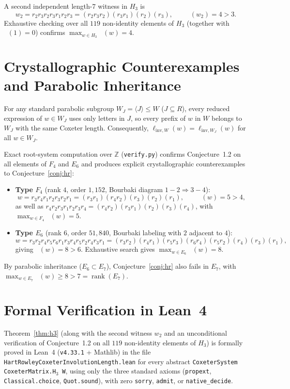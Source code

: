 \documentclass[11pt,a4paper]{article}
\DeclareMathOperator{\ilen}{\ell_{\mathrm{inv}}}
\DeclareMathOperator{\rank}{rank}
\begin{document}
A second independent length-$7$ witness in $H_3$ is
\[
w_2 = r_2 r_3 r_2 r_3 r_1 r_2 r_3 = (r_2 r_3 r_2)(r_3 r_1)(r_2)(r_3), \qquad \ilen(w_2) = 4 > 3.
\]
Exhaustive checking over all $119$ non-identity elements of $H_3$ (together with $\ilen(1) = 0$) confirms $\max_{w \in H_3} \ilen(w) = 4$.

\section{Crystallographic Counterexamples and Parabolic Inheritance}

For any standard parabolic subgroup $W_J = \langle J \rangle \le W$ ($J \subseteq R$), every reduced expression of $w \in W_J$ uses only letters in $J$, so every prefix of $w$ in $W$ belongs to $W_J$ with the same Coxeter length. Consequently, $\ell_{\mathrm{inv}, W}(w) = \ell_{\mathrm{inv}, W_J}(w)$ for all $w \in W_J$.

Exact root-system computation over $\mathbb{Z}$ (\texttt{verify.py}) confirms Conjecture~1.2 on all elements of $F_4$ and $E_6$ and produces explicit crystallographic counterexamples to Conjecture~\ref{conj:hr}:
\begin{itemize}
\item \textbf{Type $F_4$} (rank $4$, order $1{,}152$, Bourbaki diagram $1 - 2 \Rightarrow 3 - 4$):
\[
w = r_3 r_4 r_1 r_2 r_3 r_2 r_1 = (r_3 r_1)(r_4 r_2)(r_3)(r_2)(r_1), \qquad \ilen(w) = 5 > 4,
\]
as well as $r_4 r_2 r_3 r_1 r_2 r_3 r_4 = (r_4 r_2)(r_3 r_1)(r_2)(r_3)(r_4)$, with $\max_{w \in F_4} \ilen(w) = 5$.
\item \textbf{Type $E_6$} (rank $6$, order $51{,}840$, Bourbaki labeling with $2$ adjacent to $4$):
\[
w = r_3 r_2 r_4 r_5 r_6 r_1 r_3 r_4 r_5 r_2 r_4 r_3 r_1 = (r_3 r_2)(r_4 r_1)(r_5 r_3)(r_6 r_4)(r_5 r_2)(r_4)(r_3)(r_1),
\]
giving $\ilen(w) = 8 > 6$. Exhaustive search gives $\max_{w \in E_6} \ilen(w) = 8$.
\end{itemize}
By parabolic inheritance ($E_6 \subset E_7$), Conjecture~\ref{conj:hr} also fails in $E_7$, with $\max_{w \in E_7} \ilen(w) \ge 8 > 7 = \rank(E_7)$.

\section{Formal Verification in Lean~4}

Theorem~\ref{thm:h3} (along with the second witness $w_2$ and an unconditional verification of Conjecture~1.2 on all $119$ non-identity elements of $H_3$) is formally proved in Lean~4 (\texttt{v4.33.1} + Mathlib) in the file \texttt{HartRowleyCoxeterInvolutionLength.lean} for every abstract \texttt{CoxeterSystem CoxeterMatrix.H$_3$ W}, using only the three standard axioms (\texttt{propext}, \texttt{Classical.choice}, \texttt{Quot.sound}), with zero \texttt{sorry}, \texttt{admit}, or \texttt{native\_decide}.
\end{document}

